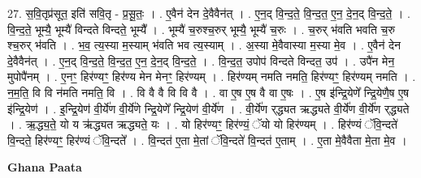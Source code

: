 \documentclass[17pt]{extarticle}
\begin{document}
27. स॒वि॒तृप्र॑सूत॒ इति॑ सवि॒तृ - प्र॒सू॒तः॒ । . ए॒वैन॑ देन दे॒वैवैन॑त् । . ए॒न॒द् वि॒न्द॒ते॒ वि॒न्द॒त॒ ए॒न॒ दे॒न॒द् वि॒न्द॒ते॒ । . वि॒न्द॒ते॒ भूम्यै॒ भूम्यै॑ विन्दते विन्दते॒ भूम्यै᳚ । . भूम्यै॑ च॒रुश्च॒रुर् भूम्यै॒ भूम्यै॑ च॒रुः । . च॒रुर् भ॑वति भवति च॒रु श्च॒रुर् भ॑वति । . भ॒व॒ त्य॒स्या म॒स्याम् भ॑वति भव त्य॒स्याम् । . अ॒स्या मे॒वैवास्या म॒स्या मे॒व । . ए॒वैन॑ देन दे॒वैवैन॑त् । . ए॒न॒द् वि॒न्द॒ते॒ वि॒न्द॒त॒ ए॒न॒ दे॒न॒द् वि॒न्द॒ते॒ । . वि॒न्द॒त॒ उपोप॑ विन्दते विन्दत॒ उप॑ । . उपै॑न मेन॒ मुपोपै॑नम् । . ए॒नꣳ॒॒ हिर॑ण्यꣳ॒॒ हिर॑ण्य मेन मेनꣳ॒॒ हिर॑ण्यम् । . हिर॑ण्यम् नमति नमति॒ हिर॑ण्यꣳ॒॒ हिर॑ण्यम् नमति । . न॒म॒ति॒ वि वि न॑मति नमति॒ वि । . वि वै वै वि वि वै । . वा ए॒ष ए॒ष वै वा ए॒षः । . ए॒ष इ॑न्द्रि॒येणे᳚ न्द्रि॒येणै॒ष ए॒ष इ॑न्द्रि॒येण॑ । . इ॒न्द्रि॒येण॑ वी॒र्ये॑ण वी॒र्ये॑णे न्द्रि॒येणे᳚ न्द्रि॒येण॑ वी॒र्ये॑ण । . वी॒र्ये॑ण र्‌द्ध्यत ऋद्ध्यते वी॒र्ये॑ण वी॒र्ये॑ण र्‌द्ध्यते । . ऋ॒द्ध्य॒ते॒ यो य ऋ॑द्ध्यत ऋद्ध्यते॒ यः । . यो हिर॑ण्यꣳ॒॒ हिर॑ण्यं॒ ॅयो यो हिर॑ण्यम् । . हिर॑ण्यं ॅवि॒न्दते॑ वि॒न्दते॒ हिर॑ण्यꣳ॒॒ हिर॑ण्यं ॅवि॒न्दते᳚ । . वि॒न्दत॑ ए॒ता मे॒तां ॅवि॒न्दते॑ वि॒न्दत॑ ए॒ताम् । . ए॒ता मे॒वैवैता मे॒ता मे॒व । \newline

\textbf{Ghana Paata } \newline
\end{document}
